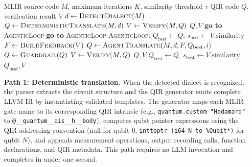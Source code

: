 \documentclass[conference]{IEEEtran}
\begin{document}
\begin{algorithm}[htbp]
\caption{Translation Path Selection and Verification Loop}
\label{alg:translation}
\begin{algorithmic}[1]
\REQUIRE MLIR source code $M$, maximum iterations $K$, similarity threshold $\tau$
\ENSURE QIR code $Q$, verification result $V$
\STATE $d \leftarrow \textsc{DetectDialect}(M)$
    \STATE $Q \leftarrow \textsc{DeterministicTranslate}(M, d)$ 
    \STATE $V \leftarrow \textsc{Verify}(M, Q)$
        \RETURN $Q, V$ 
    \ENDIF
    \STATE \textbf{go to} \textsc{AgenticLoop} 
\ELSE
    \STATE \textbf{go to} \textsc{AgenticLoop} 
\ENDIF
\STATE \textsc{AgenticLoop}:
\STATE $Q_{\text{best}} \leftarrow Q$, $s_{\text{best}} \leftarrow V.\text{similarity}$
    \STATE $F \leftarrow \textsc{BuildFeedback}(V)$
    \STATE $Q \leftarrow \textsc{AgentTranslate}(M, d, F, Q_{\text{best}}, i)$
    \STATE $Q \leftarrow \textsc{Guardrail}(Q)$ 
    \STATE $V \leftarrow \textsc{Verify}(M, Q)$
        \RETURN $Q, V$
    \ENDIF
        \STATE $Q_{\text{best}} \leftarrow Q$, $s_{\text{best}} \leftarrow V.\text{similarity}$
    \ENDIF
\ENDFOR
\RETURN $Q_{\text{best}}, V$
\end{algorithmic}
\end{algorithm}

\textbf{Path 1: Deterministic translation.} When the detected dialect is recognized, the parser extracts the circuit structure and the QIR generator emits complete LLVM IR by instantiating validated templates. The generator maps each MLIR gate name to its corresponding QIR intrinsic (e.g., \texttt{quantum.custom "Hadamard"} to \texttt{@\_\_quantum\_\_qis\_\_h\_\_body}), computes qubit pointer expressions using the QIR addressing convention (null for qubit 0, \texttt{inttoptr (i64 N to \%Qubit*)} for qubit $N$), and appends measurement operations, output recording calls, function declarations, and QIR metadata. This path requires no LLM invocation and completes in under one second.
\end{document}
